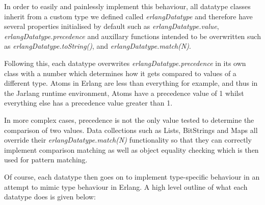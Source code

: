 \documentclass[twoside,12pt,titlepage,a4paper]{article}
\begin{document}
In order to easily and painlessly implement this behaviour, all datatype classes inherit from a custom type we defined called \textit{erlangDatatype} and therefore have several properties initialised by default such as \textit{erlangDatatype.value}, \textit{erlangDatatype.precedence} and auxillary functions intended to be overwritten such as \textit{erlangDatatype.toString()}, and \textit{erlangDatatype.match(N)}.

Following this, each datatype overwrites \textit{erlangDatatype.precedence} in its own class with a number which determines how it gets compared to values of a different type. Atoms in Erlang are less than everything for example, and thus in the Jarlang runtime environment, Atoms have a precedence value of 1 whilst everything else has a precedence value greater than 1.

In more complex cases, precedence is not the only value tested to determine the comparison of two values. Data collections such as Lists, BitStrings and Maps all override their \textit{erlangDatatype.match(N)} functionality so that they can correctly implement comparison matching as well as object equality checking which is then used for pattern matching.

Of course, each datatype then goes on to implement type-specific behaviour in an attempt to mimic type behaviour in Erlang. A high level outline of what each datatype does is given below:
\end{document}
